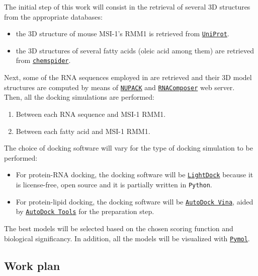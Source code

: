 The initial step of this work will consist in the retrieval of several 3D structures from the appropriate databases:

\begin{itemize}
    \item the 3D structure of mouse MSI-1's RMM1 is retrieved from \href{https://www.uniprot.org/}{\texttt{UniProt}}.
    \item the 3D structures of several fatty acids (oleic acid among them) are retrieved from \href{https://www.chemspider.com/}{\texttt{chemspider}}.
\end{itemize}

Next, some of the RNA sequences employed in \cite{dolcemascolo_2022} are retrieved and their 3D model structures are computed by means of \href{https://nupack.org/}{\texttt{NUPACK}} and \href{https://rnacomposer.cs.put.poznan.pl/}{\texttt{RNAComposer}} web server.\\

Then, all the docking simulations are performed:

\begin{enumerate}
    \item Between each RNA sequence and MSI-1 RMM1.
    \item Between each fatty acid and MSI-1 RMM1.
\end{enumerate}

The choice of docking software will vary for the type of docking simulation to be performed:

\begin{itemize}
    \item For protein-RNA docking, the docking software will be \href{https://lightdock.org/}{\texttt{LightDock}} because it is license-free, open source and it is partially written in \texttt{Python}.
    \item For protein-lipid docking, the docking software will be \href{https://vina.scripps.edu}{\texttt{AutoDock Vina}}, aided by \href{https://ccsb.scripps.edu/mgltools/}{\texttt{AutoDock Tools}} for the preparation step.
\end{itemize}

 The best models will be selected based on the chosen scoring function and biological significancy. In addition, all the models will be visualized with \href{https://pymol.org/2/}{\texttt{Pymol}}.

\subsection{Work plan}

